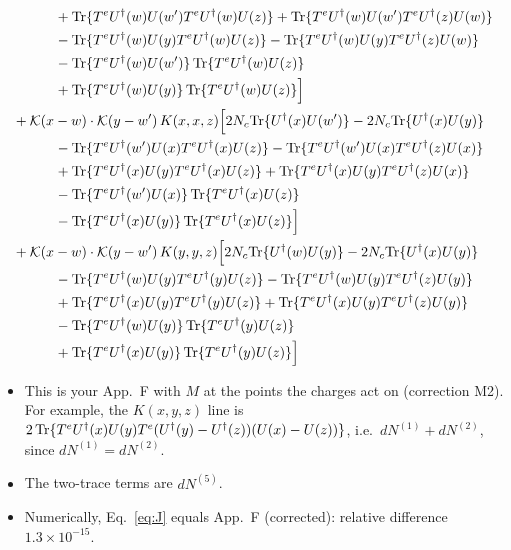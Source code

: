 \documentclass[10pt]{article}
\numberwithin{equation}{section}
\begin{document}
\begin{align}
&\quad\quad\quad+{\rm Tr}\{T^eU^\dagger(w)U(w')T^eU^\dagger(w)U(z)\}+{\rm Tr}\{T^eU^\dagger(w)U(w')T^eU^\dagger(z)U(w)\}\notag\\
&\quad\quad\quad-{\rm Tr}\{T^eU^\dagger(w)U(y)T^eU^\dagger(w)U(z)\}-{\rm Tr}\{T^eU^\dagger(w)U(y)T^eU^\dagger(z)U(w)\}\notag\\
&\quad\quad\quad-{\rm Tr}\{T^eU^\dagger(w)U(w')\}\,{\rm Tr}\{T^eU^\dagger(w)U(z)\}\notag\\
&\quad\quad\quad+{\rm Tr}\{T^eU^\dagger(w)U(y)\}\,{\rm Tr}\{T^eU^\dagger(w)U(z)\}\Big]\notag\\
&+\mathcal K(x-w)\cdot\mathcal K(y-w')\,K(x,x,z)\Big[2 N_c{\rm Tr}\{U^\dagger(x)U(w')\}-2 N_c{\rm Tr}\{U^\dagger(x)U(y)\}\notag\\
&\quad\quad\quad-{\rm Tr}\{T^eU^\dagger(w')U(x)T^eU^\dagger(x)U(z)\}-{\rm Tr}\{T^eU^\dagger(w')U(x)T^eU^\dagger(z)U(x)\}\notag\\
&\quad\quad\quad+{\rm Tr}\{T^eU^\dagger(x)U(y)T^eU^\dagger(x)U(z)\}+{\rm Tr}\{T^eU^\dagger(x)U(y)T^eU^\dagger(z)U(x)\}\notag\\
&\quad\quad\quad-{\rm Tr}\{T^eU^\dagger(w')U(x)\}\,{\rm Tr}\{T^eU^\dagger(x)U(z)\}\notag\\
&\quad\quad\quad-{\rm Tr}\{T^eU^\dagger(x)U(y)\}\,{\rm Tr}\{T^eU^\dagger(x)U(z)\}\Big]\notag\\
&+\mathcal K(x-w)\cdot\mathcal K(y-w')\,K(y,y,z)\Big[2 N_c{\rm Tr}\{U^\dagger(w)U(y)\}-2 N_c{\rm Tr}\{U^\dagger(x)U(y)\}\notag\\
&\quad\quad\quad-{\rm Tr}\{T^eU^\dagger(w)U(y)T^eU^\dagger(y)U(z)\}-{\rm Tr}\{T^eU^\dagger(w)U(y)T^eU^\dagger(z)U(y)\}\notag\\
&\quad\quad\quad+{\rm Tr}\{T^eU^\dagger(x)U(y)T^eU^\dagger(y)U(z)\}+{\rm Tr}\{T^eU^\dagger(x)U(y)T^eU^\dagger(z)U(y)\}\notag\\
&\quad\quad\quad-{\rm Tr}\{T^eU^\dagger(w)U(y)\}\,{\rm Tr}\{T^eU^\dagger(y)U(z)\}\notag\\
&\quad\quad\quad+{\rm Tr}\{T^eU^\dagger(x)U(y)\}\,{\rm Tr}\{T^eU^\dagger(y)U(z)\}\Big]
\label{eq:J}
\end{align}
\begin{itemize}
\item This is your App.~F with $M$ at the points the charges act on (correction M2). For example, the $K(x,y,z)$ line is $2\,{\rm Tr}\{T^eU^\dagger(x)U(y)T^e(U^\dagger(y)-U^\dagger(z))(U(x)-U(z))\}$, i.e.\ $dN^{(1)}+dN^{(2)}$, since $dN^{(1)}=dN^{(2)}$.
\item The two-trace terms are $dN^{(5)}$.
\item Numerically, Eq.~\eqref{eq:J} equals App.~F (corrected): relative difference $1.3\times10^{-15}$.
\end{itemize}
\end{document}
